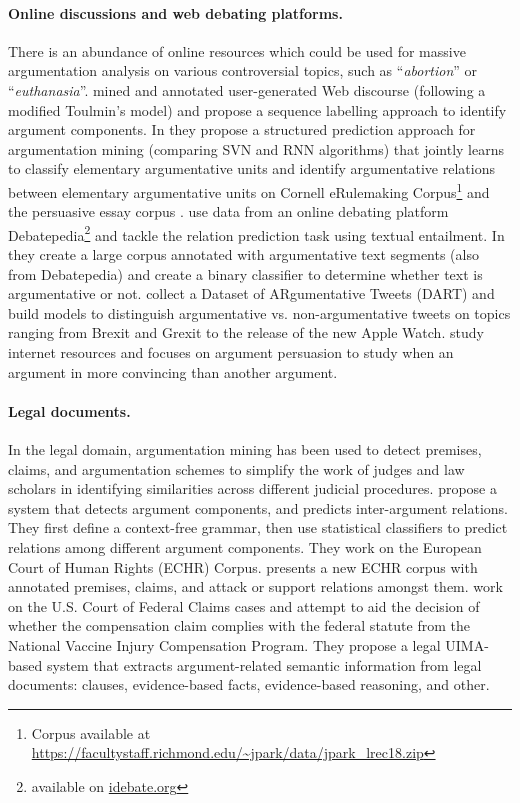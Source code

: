 \paragraph{Online discussions and web debating platforms.}
There is an abundance of online resources which could be used for
massive argumentation analysis on various controversial topics, such as 
``\emph{abortion}'' or ``\emph{euthanasia}''.
\citet{habernal2017argumentation} mined and annotated user-generated
Web discourse (following a modified Toulmin's model) and propose 
a sequence labelling approach to identify argument components. 
In \citep{niculae2017argument} they propose a structured prediction approach 
for argumentation mining (comparing SVN and RNN algorithms) that jointly
learns to classify elementary argumentative units and identify argumentative relations
between elementary argumentative units on Cornell eRulemaking Corpus\footnote{Corpus 
available at \url{https://facultystaff.richmond.edu/~jpark/data/jpark_lrec18.zip}}
and the persuasive essay corpus \citep{stab2017parsing}.
\citet{cabrio2012combining} use data from an online debating platform
Debatepedia\footnote{available on \url{idebate.org}} and tackle the relation 
prediction task using textual entailment. 
In \citep{al2016cross} they create a large corpus annotated with argumentative
text segments (also from Debatepedia) and create a binary classifier to determine
whether text is argumentative or not. \citet{dusmanu2017argument} collect 
a Dataset of ARgumentative Tweets (DART) and build models to distinguish argumentative
vs. non-argumentative tweets on topics ranging from Brexit and Grexit to 
the release of the new Apple Watch. 
\citet{habernal2016argument} study internet resources and 
focuses on argument persuasion to study when
an argument in more convincing than another argument. 

\paragraph{Legal documents. } 
In the legal domain, argumentation mining has been used to detect
premises, claims, and argumentation schemes to simplify
the work of judges and law scholars in identifying similarities 
across different judicial procedures. 
\citet{palau2009argumentation} propose a system that detects argument components, 
and predicts inter-argument relations. They first define a context-free
grammar, then use statistical classifiers to predict relations among different 
argument components. They work on the European Court of Human Rights (ECHR) Corpus.
\citet{teruel2018increasing} presents a new ECHR corpus with annotated 
premises, claims, and attack or support relations amongst them.
\citet{grabmair2015introducing} work on the U.S. Court of Federal Claims
cases and attempt to aid the decision of whether the compensation claim
complies with the federal statute from the National Vaccine Injury Compensation
Program. They propose a legal UIMA-based \citep{ferrucci2004uima} system 
that extracts argument-related semantic information from legal documents: clauses,
evidence-based facts, evidence-based reasoning, and other. 

